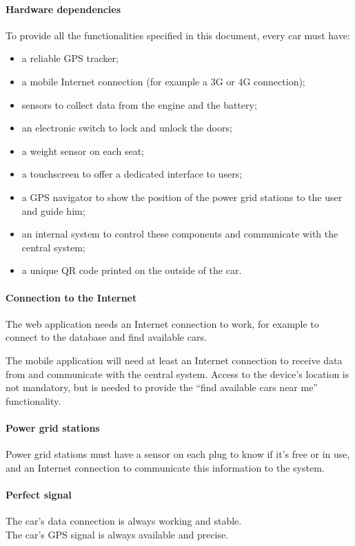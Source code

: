 \documentclass[english]{article}
\begin{document}
\begin{itemize}
\paragraph{Hardware dependencies}
To provide all the functionalities specified in this document, every car must have:
\begin{itemize}
	\item{a reliable GPS tracker;}
	\item{a mobile Internet connection (for example a 3G or 4G connection);}
	\item{sensors to collect data from the engine and the battery;}
	\item{an electronic switch to lock and unlock the doors;}
	\item{a weight sensor on each seat;}
	\item{a touchscreen to offer a dedicated interface to users;}
	\item{a GPS navigator to show the position of the power grid stations to the user and guide him;}
	\item{an internal system to control these components and communicate with the central system;}
	\item{a unique QR code printed on the outside of the car.}
\end{itemize}

\paragraph{Connection to the Internet}
The web application needs an Internet connection to work, for example to connect to the database and find available cars.

The mobile application will need at least an Internet connection to receive data from and communicate with the central system. Access to the device’s location is not mandatory, but is needed to provide the “find available cars near me” functionality.

\paragraph{Power grid stations}
Power grid stations must have a sensor on each plug to know if it's free or in use, and an Internet connection to communicate this information to the system.





\paragraph{Perfect signal}
The car’s data connection is always working and stable. \\
The car’s GPS signal is always available and precise.


\end{itemize}
\end{document}
